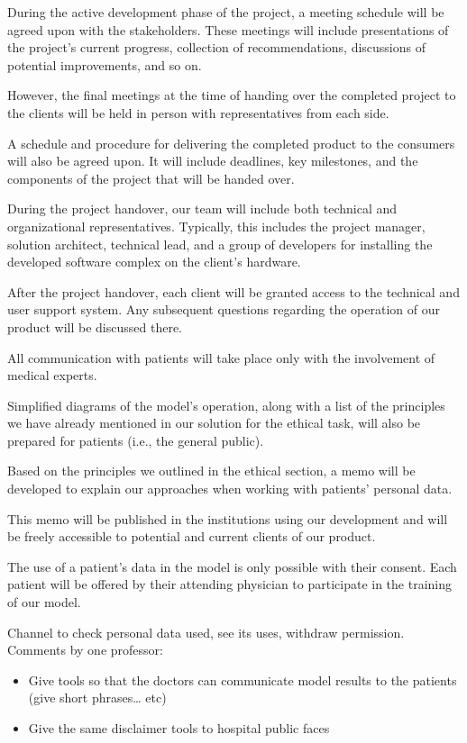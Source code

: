 During the active development phase of the project, a meeting schedule will be agreed upon with the stakeholders.
These meetings will include presentations of the project's current progress, collection of recommendations, discussions of potential improvements, and so on.

However, the final meetings at the time of handing over the completed project to the clients will be held in person with representatives from each side.

A schedule and procedure for delivering the completed product to the consumers will also be agreed upon.
It will include deadlines, key milestones, and the components of the project that will be handed over.

During the project handover, our team will include both technical and organizational representatives.
Typically, this includes the project manager, solution architect, technical lead, and a group of developers for installing the developed software complex on the client's hardware.

After the project handover, each client will be granted access to the technical and user support system.
Any subsequent questions regarding the operation of our product will be discussed there.

All communication with patients will take place only with the involvement of medical experts.

Simplified diagrams of the model's operation, along with a list of the principles we have already mentioned in our solution for the ethical task, will also be prepared for patients (i.e., the general public).

Based on the principles we outlined in the ethical section, a memo will be developed to explain our approaches when working with patients' personal data.

This memo will be published in the institutions using our development and will be freely accessible to potential and current clients of our product.

The use of a patient's data in the model is only possible with their consent.
Each patient will be offered by their attending physician to participate in the training of our model.

Channel to check personal data used, see its uses, withdraw permission. \\

Comments by one professor:

\begin{itemize}
    \item Give tools so that the doctors can communicate model results to the patients (give short phrases… etc)


    \item Give the same disclaimer tools to hospital public faces


\end{itemize}

